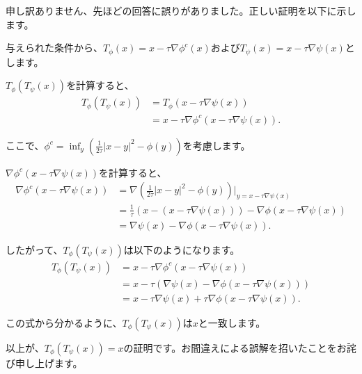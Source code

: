\documentclass{jsarticle}
\theoremstyle{definition}
\begin{document}
{\color{gray}

申し訳ありません、先ほどの回答に誤りがありました。正しい証明を以下に示します。

与えられた条件から、$T_\phi(x) = x - \tau \nabla \phi^c(x)$および$T_\psi(x) = x - \tau \nabla \psi(x)$とします。

$T_\phi(T_\psi(x))$を計算すると、
\begin{align*}
T_\phi(T_\psi(x)) &= T_\phi(x - \tau \nabla \psi(x)) \\
&= x - \tau \nabla \phi^c(x - \tau \nabla \psi(x)).
\end{align*}

ここで、$\phi^c = \inf_y \left(\frac{1}{2 \tau}|x - y|^2 - \phi(y)\right)$を考慮します。

$\nabla \phi^c(x - \tau \nabla \psi(x))$を計算すると、
\begin{align*}
\nabla \phi^c(x - \tau \nabla \psi(x)) &= \nabla \left(\frac{1}{2 \tau}|x - y|^2 - \phi(y)\right) \bigg|_{y = x - \tau \nabla \psi(x)} \\
&= \frac{1}{\tau}(x - (x - \tau \nabla \psi(x))) - \nabla \phi(x - \tau \nabla \psi(x)) \\
&= \nabla \psi(x) - \nabla \phi(x - \tau \nabla \psi(x)).
\end{align*}

したがって、$T_\phi(T_\psi(x))$は以下のようになります。
\begin{align*}
T_\phi(T_\psi(x)) &= x - \tau \nabla \phi^c(x - \tau \nabla \psi(x)) \\
&= x - \tau (\nabla \psi(x) - \nabla \phi(x - \tau \nabla \psi(x))) \\
&= x - \tau \nabla \psi(x) + \tau \nabla \phi(x - \tau \nabla \psi(x)).
\end{align*}

この式から分かるように、$T_\phi(T_\psi(x))$は$x$と一致します。

以上が、$T_\phi(T_\psi(x)) = x$の証明です。お間違えによる誤解を招いたことをお詫び申し上げます。
}
\end{document}
